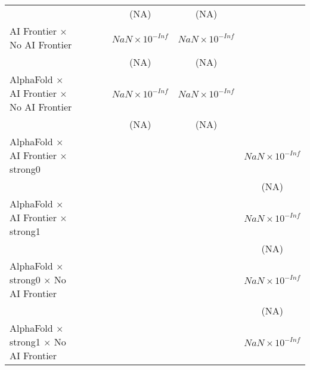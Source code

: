 \begin{tabular}{lcccccc}
                                                                              &               &               &               & (NA)                   & (NA)                   &   \\   
   AI Frontier $\times$ No AI Frontier                                        &               &               &               & $NaN\times 10^{-Inf}$  & $NaN\times 10^{-Inf}$  &   \\   
                                                                              &               &               &               & (NA)                   & (NA)                   &   \\   
   AlphaFold $\times$ AI Frontier $\times$ No AI Frontier                     &               &               &               & $NaN\times 10^{-Inf}$  & $NaN\times 10^{-Inf}$  &   \\   
                                                                              &               &               &               & (NA)                   & (NA)                   &   \\   
   AlphaFold $\times$ AI Frontier $\times$ strong0                            &               &               &               &                        &                        & $NaN\times 10^{-Inf}$\\    
                                                                              &               &               &               &                        &                        & (NA)\\   
   AlphaFold $\times$ AI Frontier $\times$ strong1                            &               &               &               &                        &                        & $NaN\times 10^{-Inf}$\\    
                                                                              &               &               &               &                        &                        & (NA)\\   
   AlphaFold $\times$ strong0 $\times$ No AI Frontier                         &               &               &               &                        &                        & $NaN\times 10^{-Inf}$\\    
                                                                              &               &               &               &                        &                        & (NA)\\   
   AlphaFold $\times$ strong1 $\times$ No AI Frontier                         &               &               &               &                        &                        & $NaN\times 10^{-Inf}$\\    

\end{tabular}
